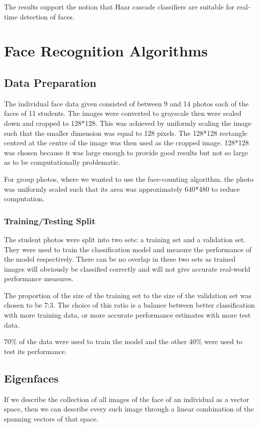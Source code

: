 \documentclass{article}
\begin{document}
The results support the notion that Haar cascade classifiers are suitable for real-time detection of faces.

\section{Face Recognition Algorithms}
\subsection{Data Preparation}
The individual face data given consisted of between 9 and 14 photos each of the faces of 11 students. The images were converted to grayscale then were scaled down and cropped to 128*128. This was achieved by uniformly scaling the image such that the smaller dimension was equal to 128 pixels. The 128*128 rectangle centred at the centre of the image was then used as the cropped image. 128*128 was chosen because it was large enough to provide good results but not so large as to be computationally problematic.

For group photos, where we wanted to use the face-counting algorithm, the photo was uniformly scaled such that its area was approximately 640*480 to reduce computation.

\subsubsection{Training/Testing Split}
\label{sec:split}
The student photos were split into two sets: a training set and a validation set. They were used to train the classification model and measure the performance of the model respectively. There can be no overlap in these two sets as trained images will obviously be classified correctly and will not give accurate real-world performance measures.

The proportion of the size of the training set to the size of the validation set was chosen to be 7:3. The choice of this ratio is a balance between better classification with more training data, or more accurate performance estimates with more test data.

70\% of the data were used to train the model and the other 40\% were used to test its performance.

\subsection{Eigenfaces}
If we describe the collection of all images of the face of an individual as a vector space, then we can describe every such image through a linear combination of the spanning vectors of that space.
\end{document}
